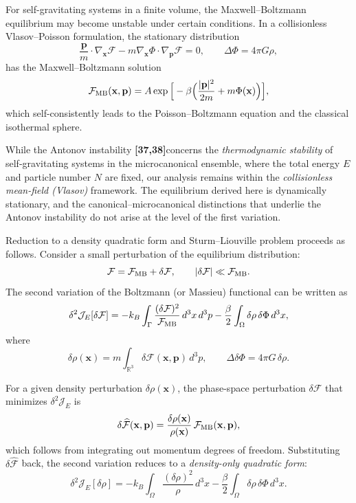 \documentclass[12pt,a4paper]{article}
\numberwithin{equation}{section}
\begin{document}
For self-gravitating systems in a finite volume, the Maxwell--Boltzmann equilibrium may become unstable under certain conditions.
In a collisionless Vlasov--Poisson formulation, the stationary distribution
\[
\frac{\mathbf{p}}{m}\cdot\nabla_{\mathbf{x}}\mathcal{F} - m\nabla_{\mathbf{x}}\Phi \cdot \nabla_{\mathbf{p}}\mathcal{F} = 0,
\qquad \Delta \Phi = 4 \pi G \rho,
\]
has the Maxwell--Boltzmann solution
\[
\mathcal{F}_{\rm MB}(\mathbf{x},\mathbf{p})
= A \exp\Big[-\beta\Big(\frac{|\mathbf{p}|^2}{2m} + m \Phi(\mathbf{x})\Big)\Big],
\]
which self-consistently leads to the Poisson--Boltzmann equation and the classical isothermal sphere.

While the Antonov instability \textbf{[37,38]}concerns the \emph{thermodynamic stability} of self-gravitating systems in the microcanonical ensemble, where the total energy \(E\) and particle number \(N\) are fixed, our analysis remains within the \emph{collisionless mean-field (Vlasov)} framework.
The equilibrium derived here is dynamically stationary, and the canonical--microcanonical distinctions that underlie the Antonov instability do not arise at the level of the first variation.

Reduction to a density quadratic form and Sturm--Liouville problem proceeds as follows.
Consider a small perturbation of the equilibrium distribution:
\[
\mathcal{F} = \mathcal{F}_{\rm MB} + \delta \mathcal{F}, \qquad |\delta \mathcal{F}| \ll \mathcal{F}_{\rm MB}.
\]
The second variation of the Boltzmann (or Massieu) functional can be written as
\[
\delta^2 \mathcal{J}_{E}[\delta \mathcal{F}]
= - k_B \int_\Gamma \frac{(\delta \mathcal{F})^2}{\mathcal{F}_{\rm MB}} \, d^3x\,d^3p
- \frac{\beta}{2} \int_\Omega \delta \rho \, \delta \Phi \, d^3x,
\]
where
\[
\delta \rho(\mathbf{x}) = m \int_{\mathbb{R}^3} \delta \mathcal{F}(\mathbf{x},\mathbf{p}) \, d^3p,
\qquad \Delta \delta \Phi = 4 \pi G \, \delta \rho.
\]

For a given density perturbation \(\delta \rho(\mathbf{x})\), the phase-space perturbation \(\delta \mathcal{F}\) that minimizes \(\delta^2 \mathcal{J}_{E}\) is
\[
\delta \widehat{\mathcal{F}}(\mathbf{x},\mathbf{p})
= \frac{\delta \rho(\mathbf{x})}{\rho(\mathbf{x})} \, \mathcal{F}_{\rm MB}(\mathbf{x},\mathbf{p}),
\]
which follows from integrating out momentum degrees of freedom.
Substituting $\delta \widehat{\mathcal{F}}$ back, the second variation reduces to a \emph{density-only quadratic form}:
\[
\delta^2 \mathcal{J}_{E}[\delta \rho]
= - k_B \int_\Omega \frac{(\delta \rho)^2}{\rho} \, d^3x
- \frac{\beta}{2} \int_\Omega \delta \rho \, \delta \Phi \, d^3x.
\]
\end{document}
